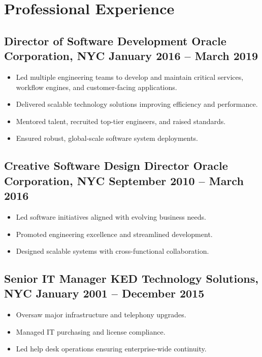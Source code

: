 \documentclass[a4paper,12pt]{article}
\begin{document}
\section*{Professional Experience}
\subsection*{Director of Software Development \hfill Oracle Corporation, NYC \newline January 2016 -- March 2019}
\begin{itemize}[leftmargin=1.5em]
    \item Led multiple engineering teams to develop and maintain critical services, workflow engines, and customer-facing applications.
    \item Delivered scalable technology solutions improving efficiency and performance.
    \item Mentored talent, recruited top-tier engineers, and raised standards.
    \item Ensured robust, global-scale software system deployments.
\end{itemize}

\subsection*{Creative Software Design Director \hfill Oracle Corporation, NYC \newline September 2010 -- March 2016}
\begin{itemize}[leftmargin=1.5em]
    \item Led software initiatives aligned with evolving business needs.
    \item Promoted engineering excellence and streamlined development.
    \item Designed scalable systems with cross-functional collaboration.
\end{itemize}

\subsection*{Senior IT Manager \hfill KED Technology Solutions, NYC \newline January 2001 -- December 2015}
\begin{itemize}[leftmargin=1.5em]
    \item Oversaw major infrastructure and telephony upgrades.
    \item Managed IT purchasing and license compliance.
    \item Led help desk operations ensuring enterprise-wide continuity.
\end{itemize}
\end{document}

